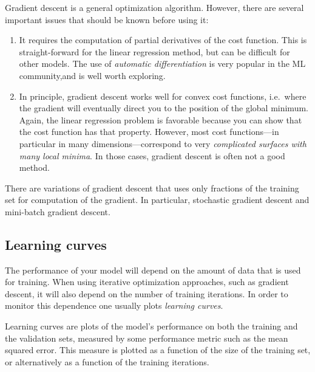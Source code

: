 \documentclass[%
oneside,                 %
final,                   %
10pt]{article}
\begin{document}
\noindent
Gradient descent is a general optimization algorithm. However, there are several important issues that should be known before using it:

\begin{enumerate}
\item It requires the computation of partial derivatives of the cost function. This is straight-forward for the linear regression method, but can be difficult for other models. The use of \emph{automatic differentiation} is very popular in the ML community,and is well worth exploring. 

\item In principle, gradient descent works well for convex cost functions, i.e.~where the gradient will eventually direct you to the position of the global minimum. Again, the linear regression problem is favorable because you can show that the cost function has that property. However, most cost functions---in particular in many dimensions---correspond to very \emph{complicated surfaces with many local minima}. In those cases, gradient descent is often not a good method.
\end{enumerate}

\noindent
There are variations of gradient descent that uses only fractions of the training set for computation of the gradient. In particular, stochastic gradient descent and mini-batch gradient descent.

\subsection{Learning curves}

The performance of your model will depend on the amount of data that is used for training. When using iterative optimization approaches, such as gradient descent, it will also depend on the number of training iterations. In order to monitor this dependence one usually plots \emph{learning curves}.

Learning curves are plots of the model's performance on both the training and the validation sets, measured by some performance metric such as the mean squared error. This measure is plotted as a function of the size of the training set, or alternatively as a function of the training iterations.
\end{document}
